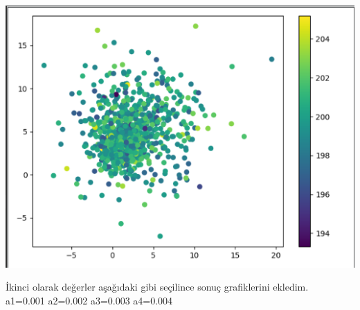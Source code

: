 \documentclass{article}
\begin{document}
\begin{center}
		\includegraphics[scale=0.4]{step3}
		
	\end{center}
		İkinci olarak değerler aşağıdaki gibi seçilince sonuç grafiklerini ekledim.\\
	a1=0.001 a2=0.002 a3=0.003 a4=0.004
\end{document}

